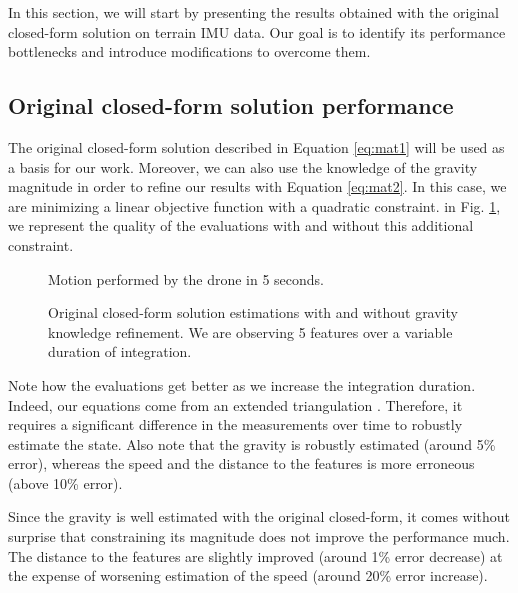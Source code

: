 \documentclass[letterpaper, 10 pt, conference]{ieeeconf}  %
\begin{document}
In this section, we will start by presenting the results obtained with the original closed-form solution on terrain IMU data.
Our goal is to identify its performance bottlenecks and introduce modifications to overcome them.


\subsection{Original closed-form solution performance}

The original closed-form solution described in Equation \ref{eq:mat1} will be used as a basis for our work.
Moreover, we can also use the knowledge of the gravity magnitude in order to refine our results with Equation \ref{eq:mat2}.
In this case, we are minimizing a linear objective function with a quadratic constraint.
in Fig. \ref{fig:original}, we represent the quality of the evaluations with and without this additional constraint.


\begin{figure}[h!]
  \centering
    \resizebox{0.6\columnwidth}{!}{}
    \caption{Motion performed by the drone in 5 seconds.}
\end{figure}

\begin{figure}[h!]
  \centering
    \resizebox{0.7\columnwidth}{!}{}
    \caption{Original closed-form solution estimations with and without gravity knowledge refinement. We are observing 5 features  over a variable duration of integration.\label{fig:original}}
\end{figure}


Note how the evaluations get better as we increase the integration duration.
Indeed, our equations come from an extended triangulation \cite{Martinelli2012}.
Therefore, it requires a significant difference in the measurements over time to robustly estimate the state.
Also note that the gravity is robustly estimated (around 5\% error), whereas the speed and the distance to the features is more erroneous (above 10\% error).

Since the gravity is well estimated with the original closed-form, it comes without surprise that constraining its magnitude does not improve the performance much.
The distance to the features are slightly improved (around 1\% error decrease) at the expense of worsening estimation of the speed (around 20\% error increase).
\end{document}
